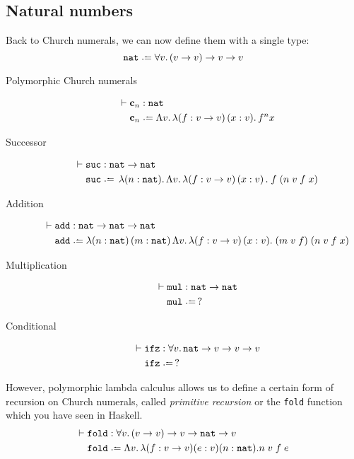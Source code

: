 \subsection{Natural numbers}
Back to Church numerals, we can now define them with a single type:
\[
  \nat \defeq \forall v.\, (v\to v)\to v\to v
\]
  \begin{description}
    \item[Polymorphic Church numerals]
      \begin{align*}
        \vdash{} & \bc_n : \nat \\
        & \bc_n \defeq \Lambda v.\,\lambda (f:v \to v)\,(x:v).\,
        f^n x
      \end{align*}
    \item[Successor]
      \begin{align*}
        \vdash{} & \suc : \nat \to \nat \\
        & \suc \defeq \,\lambda (n : \nat).\,\Lambda v.\,\lambda
        (f : v \to v)\,(x:v)\,.\;f\;(n\;v\;f\;x) 
      \end{align*}
    \item[Addition]
      \begin{align*}
        \vdash{} & \add : \nat \to \nat \to \nat \\
        & \add \defeq \lambda (n : \nat)\,(m:\nat)\,\Lambda v.\,
        \lambda (f:v\to v)\,(x: v).\; (m\;v\;f)\;(n\;v\;f\;x) 
      \end{align*}
    \item[Multiplication] 
      \begin{align*}
      \vdash{} & \mul : \nat\to \nat \\
        & \mul \defeq\,?
      \end{align*}
    \item[Conditional]
      \begin{align*}
        \vdash {} & \ifz : \forall v.\,\nat \to v \to v \to v \\
        & \ifz \defeq\,?
      \end{align*}
  \end{description}
However, polymorphic lambda calculus allows us to define a certain form of
recursion on Church numerals, called \emph{primitive recursion} or the
\texttt{fold} function which you have seen in Haskell.
\begin{align*}
  \vdash{} & \mathtt{fold} : \forall v.\, (v \to v) \to v \to \nat \to v  \\
  & \mathtt{fold} \defeq \Lambda v.\, \lambda (f : v \to v)(e : v)(n : \nat). 
  n\;v\;f\;e
\end{align*}
